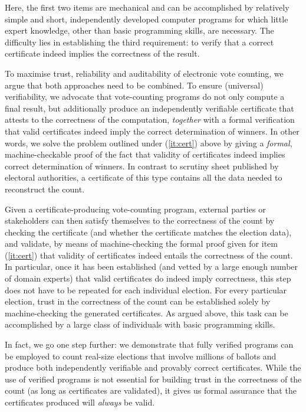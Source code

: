 \documentclass{llncs}
\begin{document}
\noindent
Here, the first two items are mechanical and can be accomplished by
relatively simple and short, independently developed computer
programs for which little expert knowledge, other than basic
programming skills, are necessary. The difficulty lies in
establishing the third requirement: to verify that a correct
certificate indeed implies the correctness of the result. 

To maximise trust, reliability and auditability of electronic vote counting, we
argue that both approaches need to be combined. To ensure
(universal) verifiability, we advocate that vote-counting programs
do not only compute a final result, but additionally produce an
independently verifiable certificate that attests to the correctness
of the computation, \emph{together} with a formal verification that
valid certificates indeed imply the correct determination of
winners.  In other words, we solve the problem outlined under
(\ref{it:cert}) above by giving a \emph{formal}, machine-checkable
proof of the fact that validity of certificates indeed implies
correct determination of winners. In contrast to scrutiny sheet 
published by electoral authorities, a certificate of this type 
contains all the data needed to reconstruct the count.

Given a certificate-producing vote-counting program, external
parties or stakeholders can then satisfy themselves to the
correctness of the count by checking the certificate (and whether
the certificate matches the election data), and validate, by means
of machine-checking the formal proof given for item (\ref{it:cert})
that validity of certificates indeed entails the correctness of the
count. In particular, once it has
been established (and vetted by a large enough number of domain
experts) that valid certificates do indeed imply correctness, this
step does not have to be repeated for each individual
election.  For every particular election, trust in the
correctness of the count can be established solely by
machine-checking the generated certificates. As argued
above, this task can be accomplished by a large class of individuals 
with basic programming skills.

In fact, we go one step further: we demonstrate that
fully verified programs can be employed to count real-size elections
that involve millions of ballots and produce both independently
verifiable and provably correct certificates. While the use of verified
programs is not essential for building trust in the correctness of
the count (as long as certificates are validated), it gives us
formal assurance that the certificates produced will \emph{always}
be valid.
\end{document}
